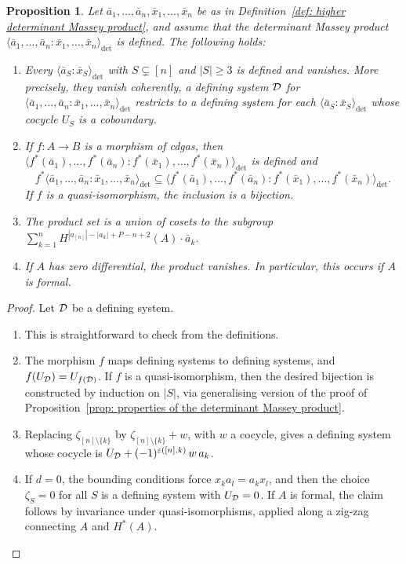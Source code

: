 \documentclass[11pt]{article}
\newtheorem{proposition}[theorem]{Proposition}
\theoremstyle{definition}
\theoremstyle{definition}
\begin{document}
\begin{proposition}
\label{prop: higher properties}
Let $\bar a_1,\ldots,\bar a_n,\bar x_1,\ldots,\bar x_n$ be as in
Definition~\ref{def: higher determinant Massey product},
and assume that the determinant Massey product 
$\langle \bar a_1, \dots,\bar a_n:\bar x_1,\dots,\bar x_n \rangle_{\det}$ is defined.
The following holds:
\begin{enumerate}
\item 
Every $\langle \bar a_{S}:\bar x_{S}\rangle_{\det}$ with $S\subsetneq[n]$ and $|S|\geq 3$ is defined and vanishes.
More precisely, they vanish coherently, a defining system $\mathcal D$ for
$\langle \bar a_1,\ldots,\bar a_n:\bar x_1,\ldots,\bar x_n\rangle_{\det}$
restricts to a defining system for each $\langle \bar a_{S}:\bar x_{S}\rangle_{\det}$ whose cocycle $U_S$ is a coboundary.
\item 
If $f\colon A\to B$ is a morphism of cdgas, then $\langle f^*(\bar a_1),\ldots,f^*(\bar a_n) : f^*(\bar x_1),\ldots,f^*(\bar x_n)\rangle_{\det}$ is defined and
\begin{equation*}
f^*\langle \bar a_1,\ldots,\bar a_n:\bar x_1,\ldots,\bar x_n\rangle_{\det}\subseteq
\langle f^*(\bar a_1),\ldots,f^*(\bar a_n) : f^*(\bar x_1),\ldots,f^*(\bar x_n)\rangle_{\det}.
\end{equation*}
If $f$ is a quasi-isomorphism, the inclusion is a bijection.
\item 
The product set is a union of cosets to the subgroup
$\sum_{k=1}^n H^{|a_{[n]}|-|a_k|+ P -n+2}(A)\cdot \bar a_k$.
\item 
If $A$ has zero differential, the product vanishes.
In particular, this occurs if $A$ is formal.
\end{enumerate}
\end{proposition}

\begin{proof}
Let $\mathcal D$ be a defining system.
\begin{enumerate}
\item 
This is straightforward to check from the definitions. 


\item 
The morphism $f$ maps defining systems to defining systems, and $f(U_{\mathcal D})=U_{f(\mathcal D)}$.
If $f$ is a quasi-isomorphism, then the desired bijection is constructed by induction on $|S|$,
via generalising version of the proof of Proposition~\ref{prop: properties of the determinant Massey product}.

    
\item
Replacing $\zeta_{[n]\setminus\{k\}}$ by $\zeta_{[n]\setminus\{k\}}+w$, with $w$ a cocycle,
gives a defining system whose cocycle is $U_{\mathcal D}+(-1)^{\varepsilon([n],k)}\,w\,a_k$.


\item 
If $d=0$, the bounding conditions force $x_ka_l=a_kx_l$, and then the choice $\zeta_S=0$ for all $S$
is a defining system with $U_{\mathcal D}=0$.
If $A$ is formal, the claim follows by invariance under quasi-isomorphisms,
applied along a zig-zag connecting $A$ and $H^*(A)$.
\end{enumerate}
\end{proof}
\end{document}

